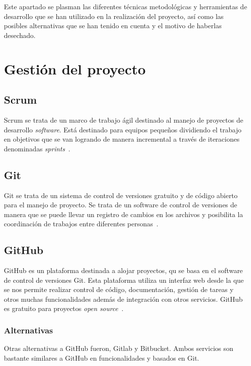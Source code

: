 
Este apartado se plasman las diferentes técnicas metodológicas y herramientas de desarrollo que se han utilizado en la realización del proyecto, así como las posibles alternativas que se han tenido en cuenta y el motivo de haberlas desechado.

\section{Gestión del proyecto}\label{GesProyecto}
\subsection{Scrum}\label{Scrum}
Scrum se trata de un marco de trabajo ágil destinado al manejo de proyectos de desarrollo \emph{software}. Está destinado para equipos pequeños dividiendo el trabajo en objetivos que se van logrando de manera incremental a través de iteraciones denominadas \emph{sprints}~\cite{wiki:scrm}.

\subsection{Git}\label{Git}
Git se trata de un sistema de control de versiones gratuito y de código abierto para el manejo de proyecto. Se trata de un software de control de versiones de manera que se puede llevar un registro de cambios en los archivos y posibilita la coordinación de trabajos entre diferentes personas~\cite{git_1,git_2}.

\subsection{GitHub}\label{GitHub}
GitHub es un plataforma destinada a alojar proyectos, qu se basa en el software de control de versiones Git. Esta plataforma utiliza un interfaz web desde la que se nos permite realizar control de código, documentación, gestión de tareas y otros muchas funcionalidades además de integración con otros servicios. GitHub es gratuito para proyectos \emph{open source}~\cite{wiki:github_wiki,github}.

\subsubsection{Alternativas}\label{AlternativasGitHub}
Otras alternativas a GitHub fueron, Gitlab y Bitbucket. Ambos servicios son bastante similares a GitHub en funcionalidades y basados en Git.

